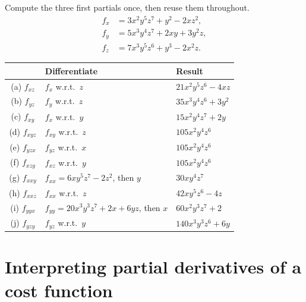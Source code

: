 \begin{solution}
Compute the three first partials once, then reuse them throughout.
\[
\begin{aligned}
f_x&=3x^{2}y^{5}z^{7}+y^{2}-2xz^{2},\\
f_y&=5x^{3}y^{4}z^{7}+2xy+3y^{2}z,\\
f_z&=7x^{3}y^{5}z^{6}+y^{3}-2x^{2}z .
\end{aligned}
\]

\begin{center}
\small\sffamily
\begin{tabular}{@{}c L{5.0cm} L{6.6cm}@{}}
\toprule
 & Differentiate & Result \\
\midrule
(a) $f_{xz}$   & $f_x$ w.r.t.\ $z$ & $21x^{2}y^{5}z^{6}-4xz$ \\
(b) $f_{yz}$   & $f_y$ w.r.t.\ $z$ & $35x^{3}y^{4}z^{6}+3y^{2}$ \\
(c) $f_{xy}$   & $f_x$ w.r.t.\ $y$ & $15x^{2}y^{4}z^{7}+2y$ \\
(d) $f_{xyz}$  & $f_{xy}$ w.r.t.\ $z$ & $105x^{2}y^{4}z^{6}$ \\
(e) $f_{yzx}$  & $f_{yz}$ w.r.t.\ $x$ & $105x^{2}y^{4}z^{6}$ \\
(f) $f_{xzy}$  & $f_{xz}$ w.r.t.\ $y$ & $105x^{2}y^{4}z^{6}$ \\
(g) $f_{xxy}$  & $f_{xx}=6xy^{5}z^{7}-2z^{2}$, then $y$ & $30xy^{4}z^{7}$ \\
(h) $f_{xxz}$  & $f_{xx}$ w.r.t.\ $z$ & $42xy^{5}z^{6}-4z$ \\
(i) $f_{yyx}$  & $f_{yy}=20x^{3}y^{3}z^{7}+2x+6yz$, then $x$ & $60x^{2}y^{3}z^{7}+2$ \\
(j) $f_{yzy}$  & $f_{yz}$ w.r.t.\ $y$ & $140x^{3}y^{3}z^{6}+6y$ \\
\bottomrule
\end{tabular}
\end{center}


\end{solution}

\section{Interpreting partial derivatives of a cost function}

